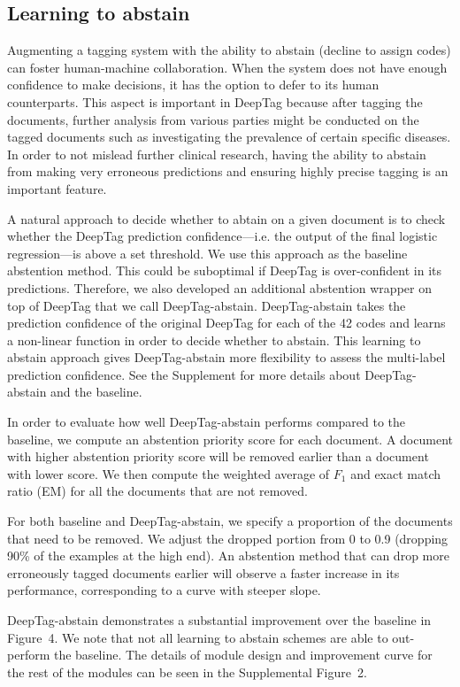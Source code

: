 \documentclass{article}[11pt,oneside]
\begin{document}
\subsection*{Learning to abstain}

Augmenting a tagging system with the ability to abstain (decline to assign codes) can foster human-machine collaboration. When the system does not have enough confidence to make decisions, it has the option to defer to its human counterparts. This aspect is important in DeepTag because after tagging the documents, further analysis from various parties might be conducted on the tagged documents such as investigating the prevalence of certain specific diseases. In order to not mislead further clinical research, having the ability to abstain from making very erroneous predictions and ensuring highly precise tagging is an important feature.

A natural approach to decide whether to abtain on a given document is to check whether the DeepTag prediction confidence---i.e. the output of the final logistic regression---is above a set threshold. We use this approach as the baseline abstention method. This could be suboptimal if DeepTag is over-confident in its predictions. Therefore, we also developed an additional abstention wrapper on top of DeepTag that we call DeepTag-abstain. DeepTag-abstain takes the prediction confidence of the original DeepTag for each of the 42 codes and learns a non-linear function in order to decide whether to abstain. This learning to abstain approach gives DeepTag-abstain more flexibility to assess the multi-label prediction confidence. See the Supplement for more details about DeepTag-abstain and the baseline.

In order to evaluate how well DeepTag-abstain performs compared to the baseline, we compute an abstention priority score for each document. A document with higher abstention priority score will be removed earlier than a document with lower score. We then compute the weighted average of $F_1$ and exact match ratio (EM) for all the documents that are not removed.

For both baseline and DeepTag-abstain, we specify a proportion of the documents that need to be removed. We adjust the dropped portion from 0 to 0.9 (dropping 90\% of the examples at the high end). An abstention method that can drop more erroneously tagged documents earlier will observe a faster increase in its performance, corresponding to a curve with steeper slope. 

DeepTag-abstain demonstrates a substantial improvement over the baseline in Figure~4. 
We note that not all learning to abstain schemes are able to out-perform the baseline. The details of module design and improvement curve for the rest of the modules can be seen in the Supplemental Figure~2.
\end{document}

